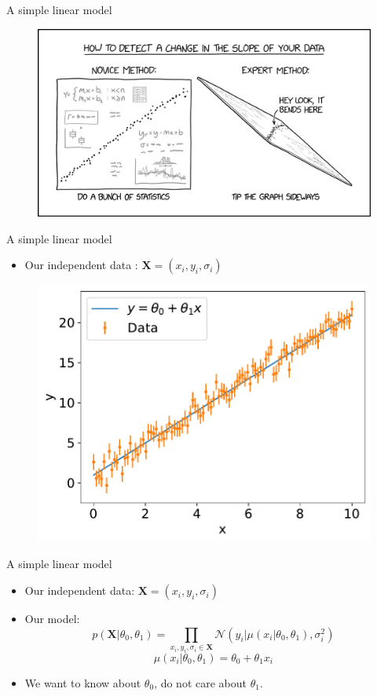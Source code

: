 \documentclass[
aspectratio=169,
14pt,
professionalfonts
]{beamer}
\newcommand{\arrow}{~\ding{220}~}
\begin{document}
\begin{frame}{A simple linear model}
    \begin{figure}
        \centering
        \includegraphics[width=0.8\linewidth]{../plots/change_in_slope_2x.png}
    \end{figure}
\end{frame}

\begin{frame}{A simple linear model}

    \begin{itemize}
        \item Our independent data : $\boldsymbol{X} = (x_i, y_i, \sigma_i)$
    \end{itemize}

    \begin{figure}
        \centering
        \includegraphics[width=0.5\linewidth]{../plots/linear_data.pdf}
    \end{figure}

\end{frame}

\begin{frame}{A simple linear model}
    \begin{itemize}
        \item Our independent data: $\boldsymbol{X} = (x_i, y_i, \sigma_i)$
        \item Our model:
        $$ p(\boldsymbol{X}|\theta_0, \theta_1) = \prod_{x_i, y_i,\sigma_i \in \boldsymbol{X}}\mathcal{N}(y_i | \mu(x_i|\theta_0, \theta_1), \sigma_i^2)$$
        $$\mu(x_i|\theta_0, \theta_1) = \theta_0 + \theta_1 x_i$$
         \item[\arrow] We want to know about $\theta_0$, do not care about $\theta_1$.
    \end{itemize}
\end{frame}
\end{document}
